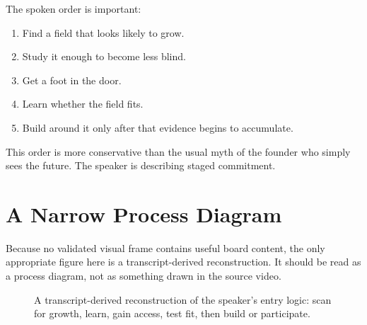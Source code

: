 The spoken order is important:

\begin{enumerate}
\item Find a field that looks likely to grow.
\item Study it enough to become less blind.
\item Get a foot in the door.
\item Learn whether the field fits.
\item Build around it only after that evidence begins to accumulate.
\end{enumerate}

This order is more conservative than the usual myth of the founder who simply sees the future. The speaker is describing staged commitment.

\section{A Narrow Process Diagram}

Because no validated visual frame contains useful board content, the only appropriate figure here is a transcript-derived reconstruction. It should be read as a process diagram, not as something drawn in the source video.

\begin{figure}
\centering
{}
\caption{A transcript-derived reconstruction of the speaker's entry logic: scan for growth, learn, gain access, test fit, then build or participate.}
\end{figure}

